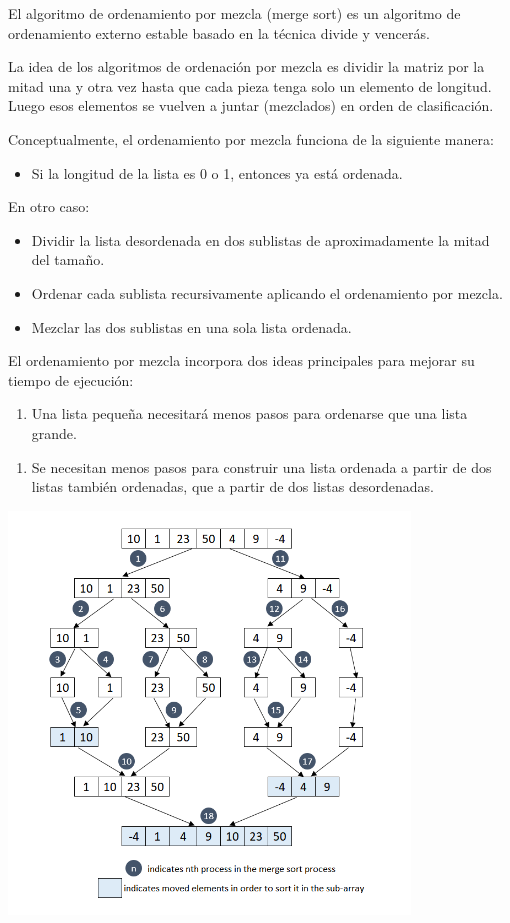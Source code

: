 \documentclass{article}
\begin{document}
\begin{enumerate}
		 El algoritmo de ordenamiento por mezcla (merge sort) es un algoritmo de ordenamiento externo estable basado en la técnica divide y vencerás.
		 
        La idea de los algoritmos de ordenación por mezcla es dividir la matriz por la mitad una y otra vez hasta que cada pieza tenga solo un elemento de longitud. Luego esos elementos se vuelven a juntar (mezclados) en orden de clasificación.
        
        Conceptualmente, el ordenamiento por mezcla funciona de la siguiente manera: 
        \begin{itemize}
            \item Si la longitud de la lista es 0 o 1, entonces ya está ordenada.
        \end{itemize}
    
        En otro caso: 
        \begin{itemize}
            \item Dividir la lista desordenada en dos sublistas de aproximadamente la mitad del tamaño. 
            \item Ordenar cada sublista recursivamente aplicando el ordenamiento por mezcla. 
            \item Mezclar las dos sublistas en una sola lista ordenada.
        \end{itemize}

        El ordenamiento por mezcla incorpora dos ideas principales para mejorar su tiempo de ejecución:
        \begin{enumerate}
            \item Una lista pequeña necesitará menos pasos para ordenarse que una lista grande.
        \end{enumerate}
        \begin{enumerate}
            \item Se necesitan menos pasos para construir una lista ordenada a partir de dos listas también ordenadas, que a partir de dos listas desordenadas.
        \end{enumerate}
    
        
    \includegraphics[width=0.8\textwidth]{Imagen/merge-sort}
    

\end{enumerate}
\end{document}
